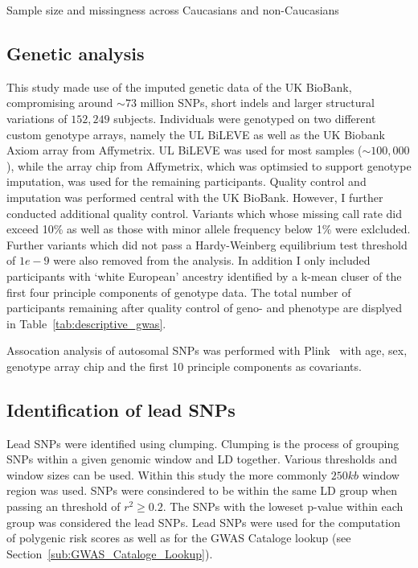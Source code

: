 \begin{table}[!htpb]
	\centering
	\resizebox{\textwidth}{!}{}
  \caption{Sample size and missingness across Caucasians and non-Caucasians }\label{tab:descriptive_gwas} 
\end{table}

\subsection{Genetic analysis}
\label{sub:genetic_analysis}
This study made use of the imputed genetic data of the UK BioBank, compromising around $\sim73$ million SNPs, short indels and larger structural variations of $152,249$ subjects.
Individuals were genotyped on two different custom genotype arrays, namely the UL BiLEVE as well as the UK Biobank Axiom array from Affymetrix. 
UL BiLEVE was used for most samples ($\sim100,000$), while the array chip from Affymetrix, which was optimsied to support genotype imputation, was used for the remaining participants. 
Quality control and imputation was performed central with the UK BioBank.
However, I further conducted additional quality control.
Variants which whose missing call rate did exceed 10\% as well as those with minor allele frequency below 1\% were exlcluded.
Further variants which did not pass a Hardy-Weinberg equilibrium test threshold of $1e-9$ were also removed from the analysis.
In addition I only included participants with `white European' ancestry identified by a k-mean cluser of the first four principle components of genotype data.
The total number of participants remaining after quality control of geno- and phenotype are displyed in Table~\ref{tab:descriptive_gwas}.

Assocation analysis of autosomal SNPs was performed with Plink~\cite{Purcell2007,Chang2015} with age, sex, genotype array chip and the first 10 principle components as covariants.

\subsection{Identification of lead SNPs}
\label{sub:Clumping}

Lead SNPs were identified using clumping.
Clumping is the process of grouping SNPs within a given genomic window and LD together.
Various thresholds and window sizes can be used.
Within this study the more commonly $250kb$ window region was used.
SNPs were consindered to be within the same LD group when passing an threshold of $r^2 \ge 0.2$.
The SNPs with the loweset p-value within each group was considered the lead SNPs.
Lead SNPs were used for the computation of polygenic risk scores as well as for the GWAS Cataloge lookup (see Section~\ref{sub:GWAS_Cataloge_Lookup}).

